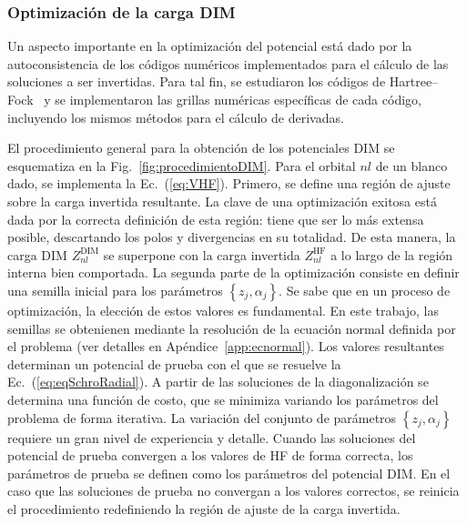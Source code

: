 \subsubsection*{Optimización de la carga DIM}
\label{subsec:optDIM}

Un aspecto importante en la optimización del potencial está dado por la 
autoconsistencia de los códigos numéricos implementados para el cálculo 
de las soluciones a ser invertidas. Para tal fin, se estudiaron los 
códigos de Hartree--Fock~\cite{FroeseFischer:97,Johnson:07} y se 
implementaron las grillas numéricas específicas de cada código, 
incluyendo los mismos métodos para el cálculo de derivadas. 

El procedimiento general para la obtención de los potenciales DIM se 
esquematiza en la Fig.~\ref{fig:procedimientoDIM}. Para el orbital $nl$
de un blanco dado, se implementa la Ec.~(\ref{eq:VHF}). Primero, se 
define una región de ajuste sobre la carga invertida resultante. La 
clave de una optimización exitosa está dada por la correcta definición 
de esta región: tiene que ser lo más extensa posible, descartando los 
polos y divergencias en su totalidad. De esta manera, la carga DIM 
$Z_{nl}^{\mathrm{DIM}}$ se superpone con la carga invertida 
$Z_{nl}^{\mathrm{HF}}$ a lo largo de la región interna bien comportada. 
La segunda parte de la optimización consiste en definir una semilla 
inicial para los parámetros $\left\{z_j,\alpha_j\right\}$. Se sabe que 
en un proceso de optimización, la elección de estos valores es 
fundamental. En este trabajo, las semillas se obtenienen mediante la 
resolución de la ecuación normal definida por el problema (ver detalles 
en Apéndice~\ref{app:ecnormal}). Los valores resultantes determinan un 
potencial de prueba con el que se resuelve la Ec.~(\ref{eq:eqSchroRadial}). 
A partir de las soluciones de la diagonalización se determina una 
función de costo, que se minimiza variando los parámetros del problema 
de forma iterativa. La variación del conjunto de parámetros $\left\{z_j,
\alpha_j\right\}$ requiere un gran nivel de experiencia y detalle. 
Cuando las soluciones del potencial de prueba convergen a los valores de 
HF de forma correcta, los parámetros de prueba se definen como los 
parámetros del potencial DIM. En el caso que las soluciones de prueba no 
convergan a los valores correctos, se reinicia el procedimiento 
redefiniendo la región de ajuste de la carga invertida.

